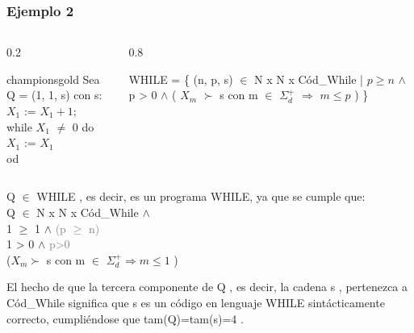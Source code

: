 \documentclass[xcolor=table]{beamer}
\begin{document}
\begin{frame}[fragile]\frametitle{Ejemplo 2} \footnotesize  


\begin{columns}
    \begin{column}{0.2\textwidth}
        \begin{colorblock}[black]{championsgold}{}\scriptsize
        Sea Q = (1, 1, s) con s: \\
        \hspace{0.5cm}   $X_1$ := $X_1 + 1$;\\
        \hspace{0.5cm}   while $X_1$ $\neq$ 0 do \\
        \hspace{0.75cm}    $X_1$ := $X_1$\\
        \hspace{0.5cm}  od
        \end{colorblock}
    \end{column}

    \begin{column}{0.8\textwidth}
        \begin{center}
            WHILE = \{ (n, p, s) $\in$ N x N x Cód\_While | $p \geq n$ $\wedge$ p > 0 $\wedge$ ( $X_m$ $\succ$ s con m $\in$ $\Sigma^+_d$ $\Rightarrow$  $m \leq  p$ ) \} 
            \end{center}
    \end{column}
\end{columns}
        
\vspace{0.2cm}

    Q $\in$ WHILE , es decir, es un programa WHILE, ya que se cumple que:\\
        \hspace{0.5cm}    Q $\in$ N x N x Cód\_While $\wedge$\\
        \hspace{0.5cm}    1 $\geq$ 1 $\wedge$ \textcolor{gray} {(p $\geq$ n)}  \\
        \hspace{0.5cm}    1 > 0  $\wedge$    \textcolor{gray}{p>0} \\
        \hspace{0.5cm}    ($X_m \succ$ s con m $\in$ $\Sigma_d^+ \Rightarrow m \leq 1$ )\\

\vspace{0.2cm}

El hecho de que la tercera componente de Q , es decir, la cadena s , pertenezca a Cód\_While significa que s es un
código en lenguaje WHILE sintácticamente correcto, cumpliéndose que tam(Q)=tam(s)=4 .

\end{frame}
\end{document}
